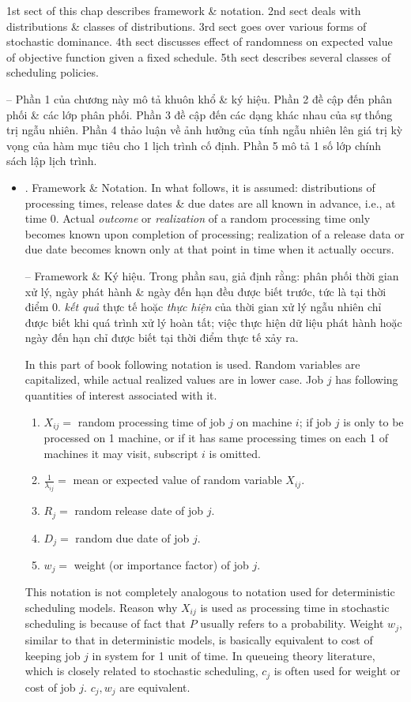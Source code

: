 \documentclass{article}
\begin{document}
\begin{itemize}
    1st sect of this chap describes framework \& notation. 2nd sect deals with distributions \& classes of distributions. 3rd sect goes over various forms of stochastic dominance. 4th sect discusses effect of randomness on expected value of objective function given a fixed schedule. 5th sect describes several classes of scheduling policies.

    -- Phần 1 của chương này mô tả khuôn khổ \& ký hiệu. Phần 2 đề cập đến phân phối \& các lớp phân phối. Phần 3 đề cập đến các dạng khác nhau của sự thống trị ngẫu nhiên. Phần 4 thảo luận về ảnh hưởng của tính ngẫu nhiên lên giá trị kỳ vọng của hàm mục tiêu cho 1 lịch trình cố định. Phần 5 mô tả 1 số lớp chính sách lập lịch trình.
    \begin{itemize}
        \item {. Framework \& Notation.} In what follows, it is assumed: distributions of processing times, release dates \& due dates are all known in advance, i.e., at time 0. Actual {\it outcome} or {\it realization} of a random processing time only becomes known upon completion of processing; realization of a release data or due date becomes known only at that point in time when it actually occurs.

        -- {\sf Framework \& Ký hiệu.} Trong phần sau, giả định rằng: phân phối thời gian xử lý, ngày phát hành \& ngày đến hạn đều được biết trước, tức là tại thời điểm 0. {\it kết quả} thực tế hoặc {\it thực hiện} của thời gian xử lý ngẫu nhiên chỉ được biết khi quá trình xử lý hoàn tất; việc thực hiện dữ liệu phát hành hoặc ngày đến hạn chỉ được biết tại thời điểm thực tế xảy ra.

        In this part of book following notation is used. Random variables are capitalized, while actual realized values are in lower case. Job $j$ has following quantities of interest associated with it.
        \begin{enumerate}
            \item $X_{ij} =$ random processing time of job $j$ on machine $i$; if job $j$ is only to be processed on 1 machine, or if it has same processing times on each 1 of machines it may visit, subscript $i$ is omitted.
            \item $\frac{1}{\lambda_{ij}} =$ mean or expected value of random variable $X_{ij}$.
            \item $R_j =$ random release date of job $j$.
            \item $D_j =$ random due date of job $j$.
            \item $w_j =$ weight (or importance factor) of job $j$.
        \end{enumerate}
        This notation is not completely analogous to notation used for deterministic scheduling models. Reason why $X_{ij}$ is used as processing time in stochastic scheduling is because of fact that $P$ usually refers to a probability. Weight $w_j$, similar to that in deterministic models, is basically equivalent to cost of keeping job $j$ in system for 1 unit of time. In queueing theory literature, which is closely related to stochastic scheduling, $c_j$ is often used for weight or cost of job $j$. $c_j,w_j$ are equivalent.


\end{itemize}
\end{itemize}
\end{document}
